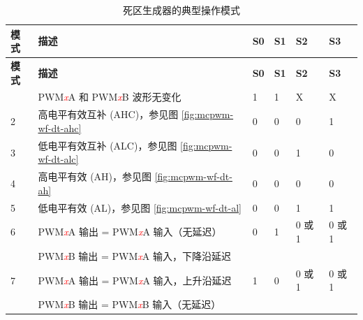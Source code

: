 \begin{longtable}[c]{ |p{1cm}|p{10cm}|p{1cm}|p{1cm}|p{1cm}|p{1cm}|}
    \caption{死区生成器的典型操作模式}
    \label{tab:mcpwm-mod-dt}
    \\\hline
    \rowcolor{lightgray}
    \textbf{模式}
    & \textbf{描述}
    & \textbf{S0}
    & \textbf{S1}
    & \textbf{S2}
    & \textbf{S3}
    \\\hline
    \endfirsthead
    \hline
    \rowcolor{lightgray}
    \textbf{模式}
    & \textbf{描述}
    & \textbf{S0}
    & \textbf{S1}
    & \textbf{S2}
    & \textbf{S3}
    \\\hline
    \endhead
    \hline
    \endfoot
    1
    & PWM\textcolor{red}{\it{x}}A 和 PWM\textcolor{red}{\it{x}}B 波形无变化
    & 1
    & 1
    & X
    & X
    \\\hline
    2
    & 高电平有效互补 (AHC)，参见图 \ref{fig:mcpwm-wf-dt-ahc}
    & 0
    & 0
    & 0
    & 1
    \\\hline
    3
    & 低电平有效互补 (ALC)，参见图 \ref{fig:mcpwm-wf-dt-alc}
    & 0
    & 0
    & 1
    & 0
    \\\hline
    4
    & 高电平有效 (AH)，参见图 \ref{fig:mcpwm-wf-dt-ah}
    & 0
    & 0
    & 0
    & 0
    \\\hline
    5
    & 低电平有效 (AL)，参见图 \ref{fig:mcpwm-wf-dt-al}
    & 0
    & 0
    & 1
    & 1
    \\\hline
    6
    & PWM\textcolor{red}{\it{x}}A 输出 = PWM\textcolor{red}{\it{x}}A 输入（无延迟）
    & 0
    & 1
    & 0 或 1
    & 0 或 1 \\
    & PWM\textcolor{red}{\it{x}}B 输出 = PWM\textcolor{red}{\it{x}}A 输入，下降沿延迟&&&&
    \\\hline
    7
    & PWM\textcolor{red}{\it{x}}A 输出 = PWM\textcolor{red}{\it{x}}A 输入，上升沿延迟
    & 1
    & 0
    & 0 或 1
    & 0 或 1\\
    & PWM\textcolor{red}{\it{x}}B 输出 = PWM\textcolor{red}{\it{x}}B 输入（无延迟） &&&&
    \\\hline
\end{longtable}